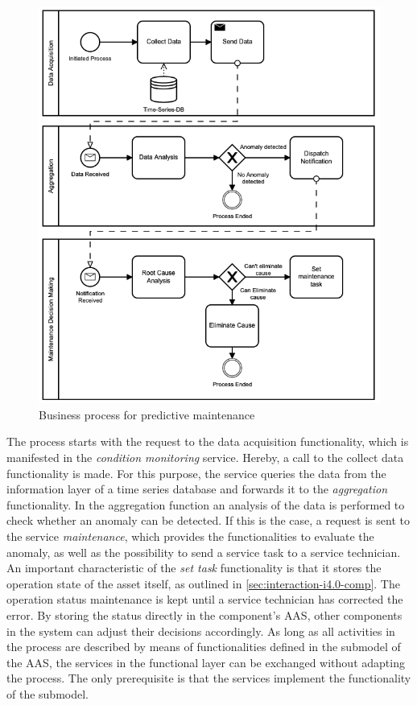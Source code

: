 \begin{figure}[h]
\centering
\includegraphics[width=.6\textwidth]{content/pictures/business_process_notation.png}
\caption{Business process for predictive maintenance}
\label{fig:pred-maintenance}
\end{figure}

The process starts with the request to the data acquisition functionality, which is manifested in the \textit{condition monitoring} service.  Hereby, a call to the collect data functionality is made. For this purpose, the service queries the data from the information layer of a time series database and forwards it to the \textit{aggregation} functionality. In the aggregation function an analysis of the data is performed to check whether an anomaly can be detected. If this is the case, a request is sent to the service \textit{maintenance}, which provides the functionalities to evaluate the anomaly, as well as the possibility to send a service task to a service technician. An important characteristic of the \textit{set task} functionality is that it stores the operation state of the asset itself, as outlined in \ref{sec:interaction-i4.0-comp}. The operation status maintenance is kept until a service technician has corrected the error. By storing the status directly in the component's \ac{AAS}, other components in the system can adjust their decisions accordingly. As long as all activities in the process are described by means of functionalities defined in the submodel of the \ac{AAS}, the services in the functional layer can be exchanged without adapting the process. The only prerequisite is that the services implement the functionality of the submodel.


